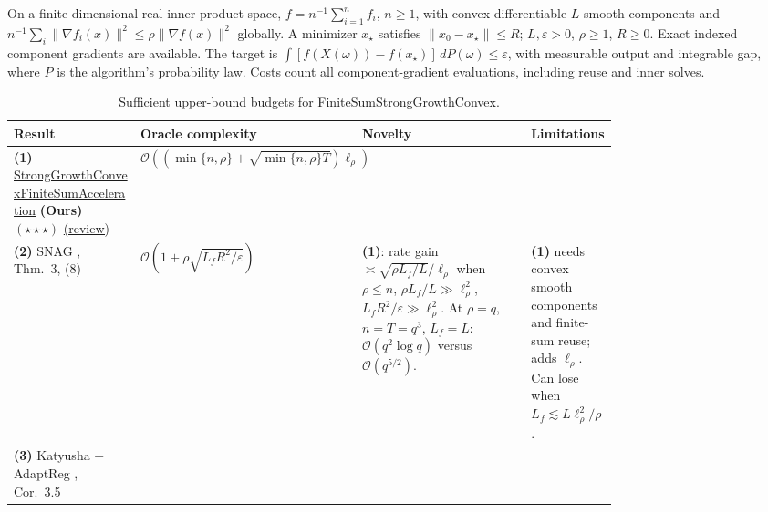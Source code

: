 \begin{table}[tp]
\centering
\caption{Sufficient upper-bound budgets for \href{https://github.com/k3nfalt/longtails/blob/main/LongTails/Setups/FiniteSumStrongGrowthConvex.lean}{FiniteSumStrongGrowthConvex}.}\label{tab:FiniteSumStrongGrowthConvex}
\parbox{\linewidth}{\footnotesize On a finite-dimensional real inner-product space, $f=n^{-1}\sum_{i=1}^n f_i$, $n\ge1$, with convex differentiable $L$-smooth components and $n^{-1}\sum_i\|\nabla f_i(x)\|^2\le\rho\|\nabla f(x)\|^2$ globally. A minimizer $x_\star$ satisfies $\|x_0-x_\star\|\le R$; $L,\varepsilon>0$, $\rho\ge1$, $R\ge0$. Exact indexed component gradients are available. The target is $\int [f(X(\omega))-f(x_\star)]\,dP(\omega)\le\varepsilon$, with measurable output and integrable gap, where $P$ is the algorithm's probability law. Costs count all component-gradient evaluations, including reuse and inner solves.}\par\smallskip
\begin{threeparttable}
\footnotesize
\setlength{\tabcolsep}{4pt}\renewcommand{\arraystretch}{1.25}
\begin{tabularx}{\linewidth}{@{}>{\raggedright\arraybackslash}p{0.21\linewidth}>{\raggedright\arraybackslash}p{0.28\linewidth}>{\raggedright\arraybackslash}p{0.28\linewidth}>{\raggedright\arraybackslash}X@{}}
\toprule
\textbf{Result} & \textbf{Oracle complexity} & \textbf{Novelty} & \textbf{Limitations} \\
\midrule
\textbf{(1)} \href{https://github.com/k3nfalt/longtails/blob/main/LongTails/Theorems/StrongGrowthConvexFiniteSumAcceleration.lean}{Strong\allowbreak Growth\allowbreak Convex\allowbreak Finite\allowbreak Sum\allowbreak Acceleration} \textbf{(Ours)} $(\star\star\star)$ \href{https://github.com/k3nfalt/longtails/blob/main/scripts/reviews/StrongGrowthConvexFiniteSumAcceleration.md}{(review)}
& $\mathcal{O}\!\left((\min\{n,\rho\}+\sqrt{\min\{n,\rho\}T})\ell_\rho\right)$ & & \\
\midrule[1.2pt]
\textbf{(2)} SNAG \citep{fsgHermant2026v3}, Thm.~3, (8)
& $\mathcal{O}\!\left(1+\rho\sqrt{L_fR^2/\varepsilon}\right)$
& \textbf{(1)}: rate gain $\asymp\sqrt{\rho L_f/L}/\ell_\rho$ when $\rho\le n$, $\rho L_f/L\gg\ell_\rho^2$, $L_fR^2/\varepsilon\gg\ell_\rho^2$. At $\rho=q$, $n=T=q^3$, $L_f=L$: $\mathcal{O}(q^2\log q)$ versus $\mathcal{O}(q^{5/2})$.
& \textbf{(1)} needs convex smooth components and finite-sum reuse; adds $\ell_\rho$. Can lose when $L_f\lesssim L\ell_\rho^2/\rho$. \\
\midrule
\textbf{(3)} Katyusha + AdaptReg \citep{AllenZhu2018KatyushaComposite}, Cor.~3.5

\end{tabularx}
\end{threeparttable}
\end{table}
